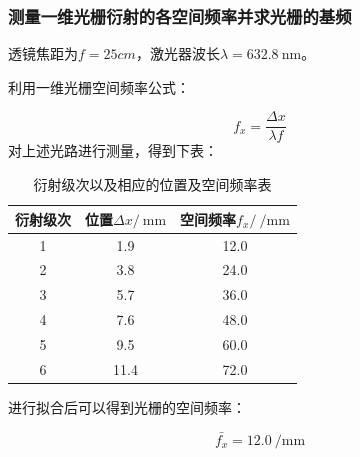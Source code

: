 \documentclass[a4paper]{article}
\begin{document}
\subsubsection{测量一维光栅衍射的各空间频率并求光栅的基频}
\hspace{2em}透镜焦距为$f=25cm$，激光器波长$\lambda=\SI{632.8}{\nm}$。\par
\hspace{2em}利用一维光栅空间频率公式：\par
$$f_x=\frac{\Delta x}{\lambda f}$$
\hspace{2em} 对上述光路进行测量，得到下表： \par
\begin{table}[htbp]
    \centering
    \captionsetup{justification=centering,margin=2cm}
    \caption{衍射级次以及相应的位置及空间频率表\label{table:1}}
    \setlength{\tabcolsep}{10mm}
    \renewcommand{\arraystretch}{1.1}
    {\begin{tabular}{ccc}
            \toprule
            衍射级次 & 位置$\Delta x/\SI{}{\mm}$ & 空间频率$f_x/\SI{}{\per\mm}$ \\
            \midrule
            1        & 1.9                       & 12.0                         \\
            2        & 3.8                       & 24.0                         \\
            3        & 5.7                       & 36.0                         \\
            4        & 7.6                       & 48.0                         \\
            5        & 9.5                       & 60.0                         \\
            6        & 11.4                      & 72.0                         \\
            \bottomrule
        \end{tabular}}
\end{table}\par
\hspace{2em} 进行拟合后可以得到光栅的空间频率： \par
$$\bar{f_x}=\SI{12.0}{\per\mm}$$

\end{document}
